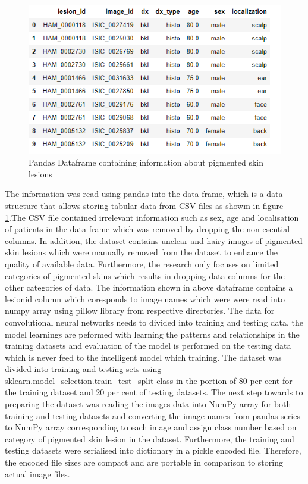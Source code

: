 \begin{figure} [!htp]
    \includegraphics[width=\textwidth]{Images/datae.png}
    \caption{Pandas Dataframe containing information about pigmented skin lesions}
    \label{fig:pandasTop}
\end{figure}

The information was read using pandas into the data frame, 
which is a data structure that allows storing tabular data from CSV files as showm in 
figure \ref{fig:pandasTop}.The CSV file contained irrelevant information such as sex, age and localisation 
of patients in the data frame which was removed by dropping the non esential columns.
In addition, the dataset contains unclear and hairy images of pigmented skin lesions which were manually 
removed from the dataset to enhance the quality of available data.
Furthermore, the research only focuses on limited categories of 
pigmented skins which results in dropping data columns for the other categories 
of data. The information shown in above dataframe contains a lesionid column which coresponds
to image names which were were read into numpy array using pillow library from respective directories.
The data for convolutional neural networks needs to divided into training and testing data, the model learnings
are peformed with learning the patterns and relationships in the training datasets and evaluation of the 
model is performed on the testing data which is never feed to the intelligent model which training.
The dataset was divided into training and testing sets using \url{sklearn.model_selection.train_test_split} class in the portion of 80 per cent for 
the training dataset and 20 per cent of testing datasets. The next step towards to preparing the dataset was reading the images data into NumPy 
array for both training and testing datasets and converting the image names from pandas series to NumPy array corresponding to each image and assign class number 
based on category of pigmented skin lesion in the dataset. Furthermore, the training and testing datasets were serialised into 
dictionary in a pickle encoded file. Therefore, the encoded file sizes are compact and are portable
in comparison to storing actual image files.